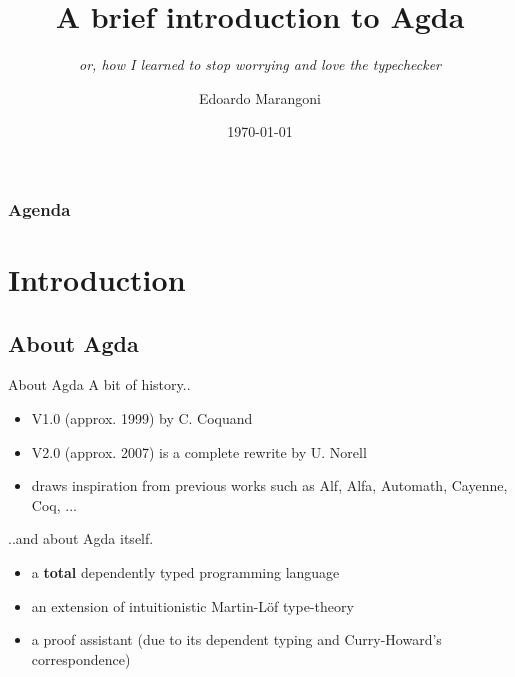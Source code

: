 \documentclass[t,aspectratio=169,9pt]{beamer}
\title{A brief introduction to Agda}
\subtitle{\it or, how I learned to stop worrying and love the typechecker }
\date{\today}
\author{Edoardo Marangoni}
\begin{document}
\frame[plain]{\titlepage}

\begin{frame}[t,plain]
	\frametitle{Agenda}
	\tableofcontents
\end{frame}

\section[intro]{Introduction}
\subsection[about]{About Agda}
\begin{frame}{About Agda}
  \vfill
  A bit of history..
  \vfill
  \begin{itemize}
    \item {V1.0 (approx. 1999) by C. Coquand}
    \item {V2.0 (approx. 2007) is a complete rewrite by U. Norell}
    \item {draws inspiration from previous works such as Alf, Alfa, Automath, Cayenne,
      Coq, ... }
  \end{itemize}
  \vfill
  ..and about Agda itself.
  \vfill
  \begin{itemize}
    \item {a {\bf total} dependently typed programming language}
    \item {an extension of intuitionistic Martin-Löf type-theory}
    \item {a proof assistant (due to its dependent typing and Curry-Howard's
      correspondence)}
  \end{itemize}
  \vfill
\end{frame}
\end{document}

